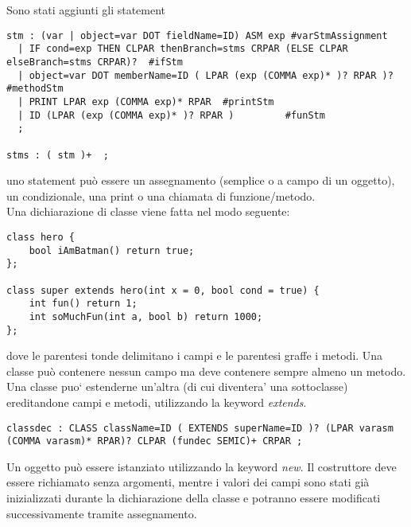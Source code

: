\documentclass[a4paper]{article}   %
\begin{document}
Sono stati aggiunti gli statement\\

\begin{lstlisting}
stm : (var | object=var DOT fieldName=ID) ASM exp #varStmAssignment
  | IF cond=exp THEN CLPAR thenBranch=stms CRPAR (ELSE CLPAR elseBranch=stms CRPAR)?  #ifStm
  | object=var DOT memberName=ID ( LPAR (exp (COMMA exp)* )? RPAR )?  #methodStm
  | PRINT LPAR exp (COMMA exp)* RPAR  #printStm
  | ID (LPAR (exp (COMMA exp)* )? RPAR )         #funStm
  ;

stms : ( stm )+  ;

\end{lstlisting}

uno statement può essere un assegnamento (semplice o a campo di un oggetto), un condizionale, una print
o una chiamata di funzione/metodo.\\
\newpage
Una dichiarazione di classe viene fatta nel modo seguente:\\

\begin{lstlisting}
class hero {
    bool iAmBatman() return true;
};

class super extends hero(int x = 0, bool cond = true) {
    int fun() return 1;
    int soMuchFun(int a, bool b) return 1000;
};
\end{lstlisting}

dove le parentesi tonde delimitano i campi e le parentesi graffe i metodi. Una classe può contenere nessun campo
ma deve contenere sempre almeno un metodo. Una classe puo` estenderne un'altra (di cui diventera' una sottoclasse)
ereditandone campi e metodi, utilizzando la keyword \textit{extends}.\\

\begin{lstlisting}
classdec : CLASS className=ID ( EXTENDS superName=ID )? (LPAR varasm (COMMA varasm)* RPAR)? CLPAR (fundec SEMIC)+ CRPAR ;

\end{lstlisting}

Un oggetto può essere istanziato utilizzando la keyword \textit{new}. Il costruttore deve essere richiamato senza argomenti, mentre i valori dei campi
sono stati già inizializzati durante la dichiarazione della classe e potranno essere modificati successivamente
tramite assegnamento.\\
\end{document}
